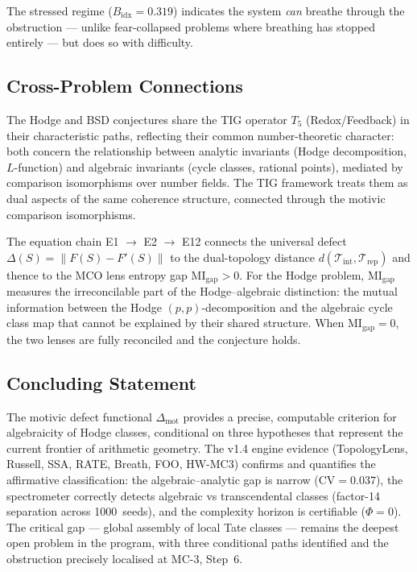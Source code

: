 \documentclass[11pt]{article}
\theoremstyle{definition}
\begin{document}
\noindent
The stressed regime ($B_{\mathrm{idx}} = 0.319$) indicates the system
\emph{can} breathe through the obstruction --- unlike fear-collapsed
problems where breathing has stopped entirely --- but does so with
difficulty.

\subsection{Cross-Problem Connections}

The Hodge and BSD conjectures share the TIG operator $T_5$
(Redox/Feedback) in their characteristic paths, reflecting their common
number-theoretic character: both concern the relationship between
analytic invariants (Hodge decomposition, $L$-function) and algebraic
invariants (cycle classes, rational points), mediated by comparison
isomorphisms over number fields.  The TIG framework treats them as dual
aspects of the same coherence structure, connected through the motivic
comparison isomorphisms.

The equation chain E1 $\to$ E2 $\to$ E12 connects the universal defect
$\Delta(S) = \|F(S) - F'(S)\|$ to the dual-topology distance
$d(\mathcal{T}_{\mathrm{int}}, \mathcal{T}_{\mathrm{rep}})$ and thence
to the MCO lens entropy gap $\mathrm{MI}_{\mathrm{gap}} > 0$.  For the
Hodge problem, $\mathrm{MI}_{\mathrm{gap}}$ measures the irreconcilable
part of the Hodge--algebraic distinction: the mutual information between
the Hodge $(p,p)$-decomposition and the algebraic cycle class map that
cannot be explained by their shared structure.  When
$\mathrm{MI}_{\mathrm{gap}} = 0$, the two lenses are fully reconciled
and the conjecture holds.

\subsection{Concluding Statement}

The motivic defect functional $\Delta_{\mathrm{mot}}$ provides a
precise, computable criterion for algebraicity of Hodge classes,
conditional on three hypotheses that represent the current frontier
of arithmetic geometry.  The v1.4 engine evidence (TopologyLens, Russell,
SSA, RATE, Breath, FOO, HW-MC3) confirms and quantifies the affirmative
classification: the algebraic--analytic gap is narrow
($\mathrm{CV} = 0.037$), the spectrometer correctly detects algebraic vs
transcendental classes (factor-14 separation across 1000~seeds), and the
complexity horizon is certifiable ($\Phi = 0$).  The critical gap ---
global assembly of local Tate classes --- remains the deepest open
problem in the program, with three conditional paths identified and
the obstruction precisely localised at MC-3, Step~6.
\end{document}
